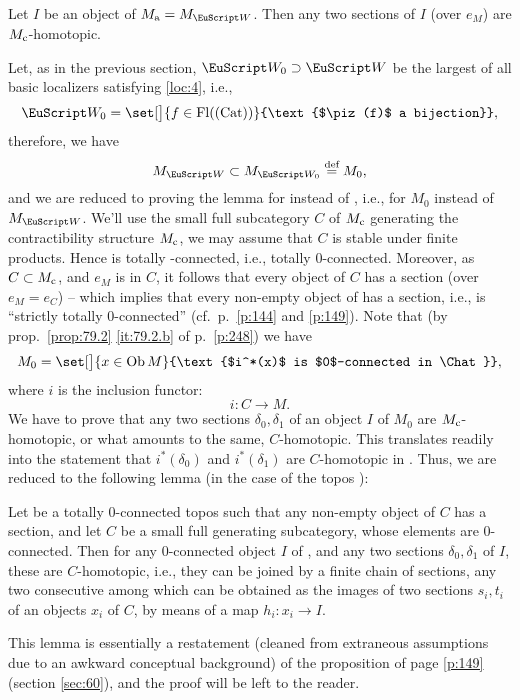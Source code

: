 \begin{lemmanum}\label{lem:82.1}
  Let $I$ be an object of $M\suba=M_\scrW$. Then any two sections of
  $I$ \textup(over $e_M$\textup) are $M_{\mathrm{c}}$-homotopic.
\end{lemmanum}

Let, as in the previous section, $\scrWz\supset\scrW$ be the largest
of all basic localizers satisfying \ref{loc:4}, i.e.,
\[\scrWz=\set[\big]{f\in\Fl(\Cat)}{\text{$\piz(f)$ a bijection}},\]
therefore, we have
\[ M_\scrW \subset M_\scrWz \eqdef M_0,\]
and we are reduced to proving the lemma for \scrWz{} instead of \scrW,
i.e., for $M_0$ instead of $M_\scrW$. We'll use the small full
subcategory $C$ of $M_{\mathrm{c}}$ generating the contractibility structure
$M_{\mathrm{c}}$, we may assume that $C$ is stable under finite
products. Hence \Chat{} is totally \scrWz-connected, i.e., totally
$0$-connected. Moreover, as $C\subset M_{\mathrm{c}}$, and $e_M$ is in $C$, it
follows that every object of $C$ has a section (over $e_M=e_C$) --
which implies that every non-empty object of \Chat{} has a section,
i.e., \Chat{} is ``strictly totally $0$-connected'' (cf.\ p.\
\ref{p:144} and \ref{p:149}). Note that (by prop.\ \ref{prop:79.2}
\ref{it:79.2.b} of p.\ \ref{p:248}) we have
\[ M_0 = \set[\big]{x\in\Ob M}{\text{$i^*(x)$ is $0$-connected in
    \Chat}},\]
where $i$ is the inclusion functor:
\[i:C\to M.\]
We have to prove that any two sections $\delta_0,\delta_1$ of an
object $I$ of $M_0$ are $M_{\mathrm{c}}$-homotopic, or what amounts to the
same, $C$-homotopic. This translates readily into the statement that
$i^*(\delta_0)$ and $i^*(\delta_1)$ are $C$-homotopic in \Chat. Thus,
we are reduced to the following lemma (in the case of the topos
\Chat):
\begin{lemmanum}\label{lem:82.2}
  Let \scrC{} be a totally $0$-connected topos such that any non-empty
  object of $C$ has a section, and let $C$ be a small full generating
  subcategory, whose elements are $0$-connected. Then for any
  $0$-connected object $I$ of \scrC, and any two sections
  $\delta_0,\delta_1$ of $I$, these are $C$-homotopic, i.e., they can
  be joined by a finite chain of sections, any two consecutive among
  which can be obtained as the images of two sections $s_i,t_i$ of an
  objects $x_i$ of $C$, by means of a map $h_i:x_i\to I$.
\end{lemmanum}

This lemma is essentially a restatement (cleaned from extraneous
assumptions due to an awkward conceptual background) of the
proposition of page \ref{p:149} (section \ref{sec:60}), and the proof
will be left to the reader.

